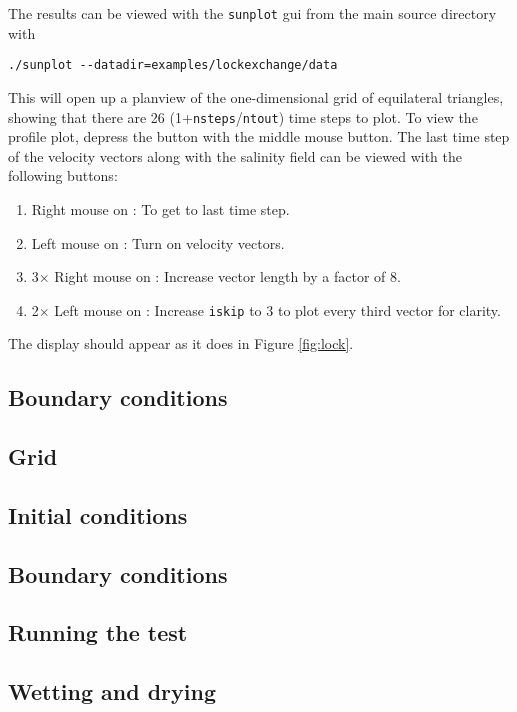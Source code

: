 \documentclass[12pt,oneside]{article}
\begin{document}
The results can be viewed with the \verb+sunplot+ gui from the main source directory with
\begin{verbatim}
./sunplot --datadir=examples/lockexchange/data
\end{verbatim}
This will open up a planview of the one-dimensional grid of equilateral triangles, showing that
there are 26 (1+\verb+nsteps+/\verb+ntout+) time steps to plot.  To view the
profile plot, depress the  button with the middle mouse button.  The last time step
of the velocity vectors along with the salinity field can be viewed with the following buttons:
\begin{enumerate}
\item Right mouse on \button{$-->$}:  To get to last time step.
\item Left mouse on : Turn on velocity vectors.
\item 3$\times$ Right mouse on : Increase vector length by a factor of 8.
\item 2$\times$ Left mouse on \button{$>$}: Increase \verb+iskip+ to 3 to plot every third vector for clarity.
\end{enumerate}
The display should appear as it does in Figure \ref{fig:lock}.

\subsection{Boundary conditions} \label{sec:boundary_ex}

\subsection{Grid}
\subsection{Initial conditions}
\subsection{Boundary conditions}
\subsection{Running the test}

\subsection{Wetting and drying} \label{sec:wettinganddrying}
\end{document}
